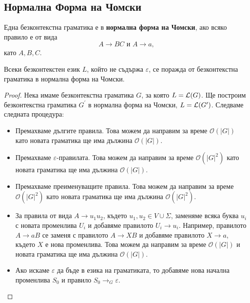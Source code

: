 \subsection{Нормална Форма на Чомски}
Една безконтекстна граматика е в {\bf нормална форма на Чомски}, ако
всяко правило е от вида
\[A \rightarrow BC\mbox{ и }A \rightarrow a,\]
като $A, B, C$.

\begin{framed}
  \begin{theorem}
    Всеки безконтекстен език $L$, който не съдържа $\varepsilon$, се поражда от безконтекстна граматика в нормална форма на Чомски.
  \end{theorem}
\end{framed}
\begin{proof}
  Нека имаме безконтекстна граматика $G$, за която $L = \mathcal{L}(G)$.
  Ще построим безконтекстна граматика $G^\prime$ в нормална форма на Чомски, $L = \mathcal{L}(G^\prime)$.
  Следваме следната процедура:
  \begin{itemize}
  \item
    Премахваме дългите правила.
    Това можем да направим за време $\mathcal{O}(|G|)$
    като новата граматика ще има дължина $\mathcal{O}(|G|)$.
  \item
    Премахваме $\varepsilon$-правилата.
    Това можем да направим за време $\mathcal{O}(|G|^2)$
    като новата граматика ще има дължина $\mathcal{O}(|G|)$.
  \item
    Премахваме преименуващите правила.
    Това можем да направим за време $\mathcal{O}(|G|^2)$
    като новата граматика ще има дължина $\mathcal{O}(|G|^2)$.
  \item
    За правила от вида $A\to u_1 u_2$, където $u_1, u_2 \in V \cup \Sigma$, 
    заменяме всяка буква $u_i$ с новата променлива $U_i$
    и добавяме правилото $U_i\to u_i$.
    Например, правилото $A \to aB$ се заменя с правилото $A \to XB$ и добавяме правилото $X \to a$,
    където $X$ е нова променлива.
    Това можем да направим за време $\mathcal{O}(|G|)$ и новата граматика ще има дължина $\mathcal{O}(|G|)$.
  \item
    Ако искаме $\varepsilon$ да бъде в езика на граматиката, то добавяме нова начална променлива $S_0$
    и правило $S_0 \to_G \varepsilon$.
  \end{itemize}
\end{proof}

